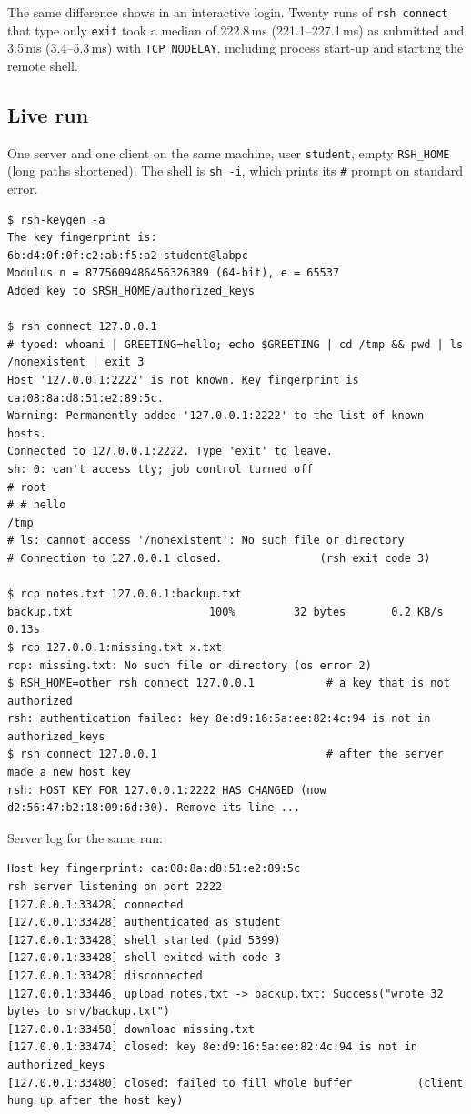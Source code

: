 \documentclass[11pt,a4paper]{article}
\begin{document}
The same difference shows in an interactive login. Twenty runs of
\texttt{rsh connect} that type only \texttt{exit} took a median of 222.8\,ms
(221.1--227.1\,ms) as submitted and 3.5\,ms (3.4--5.3\,ms) with
\texttt{TCP\_NODELAY}, including process start-up and starting the remote shell.

\subsection{Live run}

One server and one client on the same machine, user \texttt{student}, empty
\texttt{RSH\_HOME} (long paths shortened). The shell is \texttt{sh -i}, which
prints its \texttt{\#} prompt on standard error.

\begin{lstlisting}[style=plain]
$ rsh-keygen -a
The key fingerprint is:
6b:d4:0f:0f:c2:ab:f5:a2 student@labpc
Modulus n = 8775609486456326389 (64-bit), e = 65537
Added key to $RSH_HOME/authorized_keys

$ rsh connect 127.0.0.1
# typed: whoami | GREETING=hello; echo $GREETING | cd /tmp && pwd | ls /nonexistent | exit 3
Host '127.0.0.1:2222' is not known. Key fingerprint is ca:08:8a:d8:51:e2:89:5c.
Warning: Permanently added '127.0.0.1:2222' to the list of known hosts.
Connected to 127.0.0.1:2222. Type 'exit' to leave.
sh: 0: can't access tty; job control turned off
# root
# # hello
/tmp
# ls: cannot access '/nonexistent': No such file or directory
# Connection to 127.0.0.1 closed.               (rsh exit code 3)

$ rcp notes.txt 127.0.0.1:backup.txt
backup.txt                     100%         32 bytes       0.2 KB/s   0.13s
$ rcp 127.0.0.1:missing.txt x.txt
rcp: missing.txt: No such file or directory (os error 2)
$ RSH_HOME=other rsh connect 127.0.0.1           # a key that is not authorized
rsh: authentication failed: key 8e:d9:16:5a:ee:82:4c:94 is not in authorized_keys
$ rsh connect 127.0.0.1                          # after the server made a new host key
rsh: HOST KEY FOR 127.0.0.1:2222 HAS CHANGED (now d2:56:47:b2:18:09:6d:30). Remove its line ...
\end{lstlisting}

Server log for the same run:

\begin{lstlisting}[style=plain]
Host key fingerprint: ca:08:8a:d8:51:e2:89:5c
rsh server listening on port 2222
[127.0.0.1:33428] connected
[127.0.0.1:33428] authenticated as student
[127.0.0.1:33428] shell started (pid 5399)
[127.0.0.1:33428] shell exited with code 3
[127.0.0.1:33428] disconnected
[127.0.0.1:33446] upload notes.txt -> backup.txt: Success("wrote 32 bytes to srv/backup.txt")
[127.0.0.1:33458] download missing.txt
[127.0.0.1:33474] closed: key 8e:d9:16:5a:ee:82:4c:94 is not in authorized_keys
[127.0.0.1:33480] closed: failed to fill whole buffer          (client hung up after the host key)
\end{lstlisting}
\end{document}
